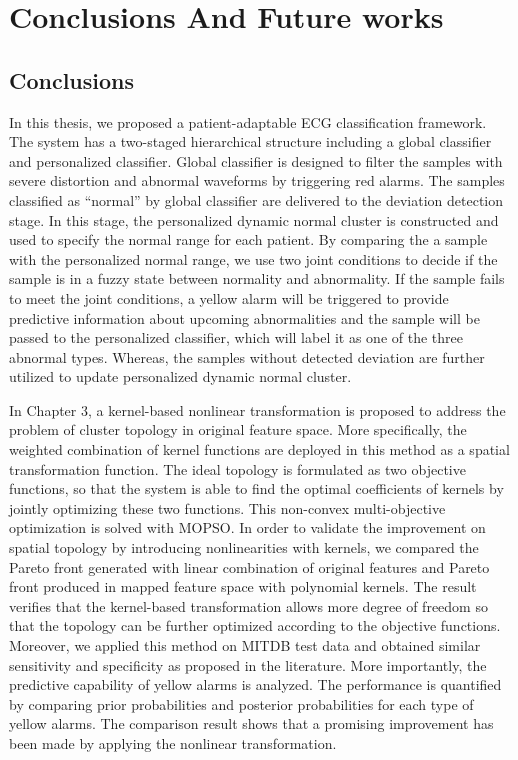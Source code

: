  \chapter{Conclusions And Future works} \label{ch:Discussion And Resuls}
 
\section{Conclusions}
In this thesis, we proposed a patient-adaptable ECG classification framework. The system has a two-staged hierarchical structure including a global classifier and personalized classifier. Global classifier is designed to filter the samples with severe distortion and abnormal waveforms by triggering red alarms. The samples classified as ``normal'' by global classifier are delivered to the deviation detection stage. In this stage, the personalized dynamic normal cluster is constructed and used to specify the normal range for each patient. By comparing the a sample with the personalized normal range, we use two joint conditions to decide if the sample is in a fuzzy state between normality and abnormality. If the sample fails to meet the joint conditions, a yellow alarm will be triggered to provide predictive information about upcoming abnormalities and the sample will be passed to the personalized classifier, which will label it as one of the three abnormal types. Whereas, the samples without detected deviation are further utilized to update personalized dynamic normal cluster.

In Chapter 3, a kernel-based nonlinear transformation is proposed to address the problem of cluster topology in original feature space. More specifically, the weighted combination of kernel functions are deployed in this method as a spatial transformation function. The ideal topology is formulated as two objective functions, so that the system is able to find the optimal coefficients of kernels by jointly optimizing these two functions. This non-convex multi-objective optimization is solved with MOPSO. In order to validate the improvement on spatial topology by introducing nonlinearities with kernels, we compared the Pareto front generated with linear combination of original features and Pareto front produced in mapped feature space with polynomial kernels. The result verifies that the kernel-based transformation allows more degree of freedom so that the topology can be further optimized according to the objective functions. Moreover, we applied this method on MITDB test data and obtained similar sensitivity and specificity as proposed in the literature. More importantly, the predictive capability of yellow alarms is analyzed. The performance is quantified by comparing prior probabilities and posterior probabilities for each type of yellow alarms. The comparison result shows that a promising improvement has been made by applying the nonlinear transformation. 


